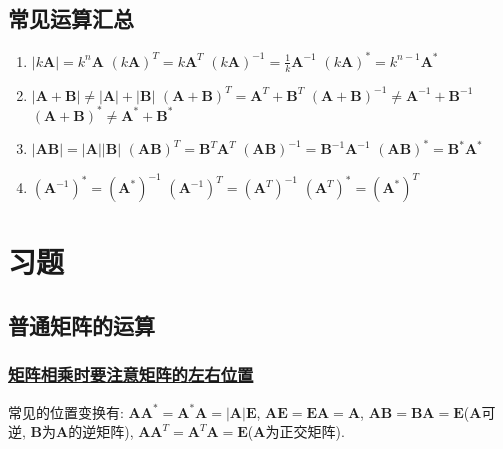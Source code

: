 \subsection{常见运算汇总}
\begin{enumerate}
\item
\subitem $ |k\bm{A}|=k^{n}\bm{A} $
\subitem $ (k\bm{A})^{T}=k\bm{A}^{T} $
\subitem $ (k\bm{A})^{-1}=\frac{1}{k}\bm{A}^{-1} $
\subitem $ (k\bm{A})^{*}=k^{n-1}\bm{A}^{*} $
\item
\subitem $ |\bm{A}+\bm{B}|\neq |\bm{A}|+|\bm{B}| $
\subitem $ (\bm{A}+\bm{B})^{T}=\bm{A}^{T}+\bm{B}^{T} $
\subitem $ (\bm{A}+\bm{B})^{-1}\neq \bm{A}^{-1}+\bm{B}^{-1} $
\subitem $ (\bm{A}+\bm{B})^{*}\neq \bm{A}^{*}+\bm{B}^{*} $
\item
\subitem $ |\bm{A}\bm{B}|=|\bm{A}||\bm{B}| $
\subitem $ (\bm{A}\bm{B})^{T}=\bm{B}^{T}\bm{A}^{T} $
\subitem $ (\bm{A}\bm{B})^{-1}=\bm{B}^{-1}\bm{A}^{-1} $
\subitem $ (\bm{A}\bm{B})^{*}=\bm{B}^{*}\bm{A}^{*} $
\item
\subitem $ (\bm{A}^{-1})^{*}=(\bm{A}^{*})^{-1} $
\subitem $ (\bm{A}^{-1})^{T}=(\bm{A}^{T})^{-1} $
\subitem $ (\bm{A}^{T})^{*}=(\bm{A}^{*})^{T} $
\end{enumerate}
\section{习题}
\subsection{普通矩阵的运算}
\subsubsection{\hyperref[矩阵相乘时要注意矩阵的左右位置]{矩阵相乘时要注意矩阵的左右位置}}
常见的位置变换有: $ \bm{A}\bm{A}^{*}=\bm{A}^{*}\bm{A}=|\bm{A}|\bm{E} $, $ \bm{A}\bm{E}=\bm{E}\bm{A}=\bm{A} $, $ \bm{A}\bm{B}=\bm{B}\bm{A}=\bm{E} $($ \bm{A} $可逆, $ \bm{B} $为$ \bm{A} $的逆矩阵), $ \bm{A}\bm{A}^{T}=\bm{A}^{T}\bm{A}=\bm{E} $($ \bm{A} $为正交矩阵).
